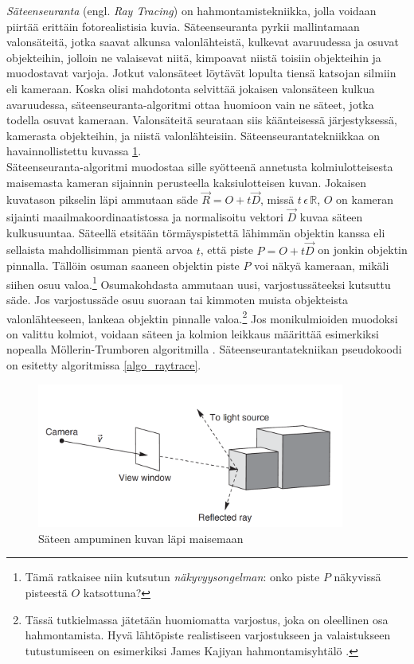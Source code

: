 \documentclass[a4paper, 12pt, titlepage]{article}
\newcommand{\R}{\mathbb{R}}
\begin{document}
\emph{Säteenseuranta} (engl. \emph{Ray Tracing}) on hahmontamistekniikka, jolla voidaan piirtää erittäin fotorealistisia kuvia. Säteenseuranta pyrkii mallintamaan valonsäteitä, jotka saavat alkunsa valonlähteistä, kulkevat avaruudessa ja osuvat objekteihin, jolloin ne valaisevat niitä, kimpoavat niistä toisiin objekteihin ja muodostavat varjoja. Jotkut valonsäteet löytävät lopulta tiensä katsojan silmiin eli kameraan. Koska olisi mahdotonta selvittää jokaisen valonsäteen kulkua avaruudessa, säteenseuranta-algoritmi ottaa huomioon vain ne säteet, jotka todella osuvat kameraan. Valonsäteitä seurataan siis käänteisessä järjestyksessä, kamerasta objekteihin, ja niistä valonlähteisiin. \citep[.]{janke} Säteenseurantatekniikkaa on havainnollistettu kuvassa \ref{raytracing}.\\

Säteenseuranta-algoritmi muodostaa sille syötteenä annetusta kolmiulotteisesta maisemasta kameran sijainnin perusteella kaksiulotteisen kuvan. Jokaisen kuvatason pikselin läpi ammutaan säde $\vec{R}=O+t\vec{D}$, missä $t\,\epsilon\,\R$, $O$ on kameran sijainti maailmakoordinaatistossa ja normalisoitu vektori $\vec{D}$ kuvaa säteen kulkusuuntaa. Säteellä etsitään törmäyspistettä lähimmän objektin kanssa eli sellaista mahdollisimman pientä arvoa $t$, että piste $P=O+t\vec{D}$ on jonkin objektin pinnalla. Tällöin osuman saaneen objektin piste $P$ voi näkyä kameraan, mikäli siihen osuu valoa.\footnote{Tämä ratkaisee niin kutsutun \emph{näkyvyysongelman}: onko piste $P$ näkyvissä pisteestä $O$ katsottuna?} Osumakohdasta ammutaan uusi, varjostussäteeksi kutsuttu säde. Jos varjostussäde osuu suoraan tai kimmoten muista objekteista valonlähteeseen, lankeaa objektin pinnalle valoa.\footnote{Tässä tutkielmassa jätetään huomiomatta varjostus, joka on oleellinen osa hahmontamista. Hyvä lähtöpiste realistiseen varjostukseen ja valaistukseen tutustumiseen on esimerkiksi James Kajiyan hahmontamisyhtälö \citep[ks.][]{kajiya}.}  \citep[.]{janke} Jos monikulmioiden muodoksi on valittu kolmiot, voidaan säteen ja kolmion leikkaus määrittää esimerkiksi nopealla Möllerin-Trumboren algoritmilla \citep[ks.][]{moller}. Säteenseurantatekniikan pseudokoodi on esitetty algoritmissa \ref{algo_raytrace}.\\


\begin{figure}
 \centering 
 \includegraphics[width=0.9\textwidth]{img/raytracing.png}
 \vspace{0.4cm}
 \caption{Säteen ampuminen kuvan läpi maisemaan \citep{janke}}
 \label{raytracing}
 \vspace{-0.5cm}
\end{figure}
\end{document}
